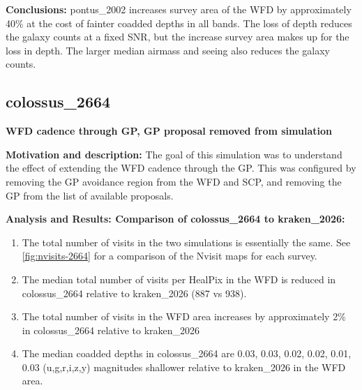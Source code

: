\documentclass[DM,authoryear,toc]{lsstdoc}
\begin{document}
\textbf{Conclusions:} pontus\_2002 increases survey area of the WFD by approximately 40$\%$ at the cost of fainter coadded depths in
all bands. The loss of depth reduces the galaxy counts at a fixed SNR, but the increase survey area makes up for the loss in depth. The
larger median airmass and seeing also reduces the galaxy counts.

\subsection{colossus\_2664} \label{colossus2664}

\textbf{WFD cadence through GP, GP proposal removed from simulation}

\textbf{Motivation and description:} The goal of this simulation was to understand the effect of extending the
WFD cadence through the GP. This was configured by removing the GP avoidance region from the WFD
and SCP, and removing the GP from the list of available proposals.

\textbf{Analysis and Results: Comparison of colossus\_2664 to kraken\_2026:}

\begin{enumerate}
\item The total number of visits in the two simulations is essentially the same. See \autoref{fig:nvisits-2664}
for a comparison of the Nvisit maps for each survey.
\item The median total number of visits per HealPix in the WFD is reduced in colossus\_2664  relative to kraken\_2026 (887 vs 938).
\item The total number of visits in the WFD area increases by approximately 2$\%$ in colossus\_2664 relative to kraken\_2026
\item The median coadded depths in colossus\_2664 are 0.03, 0.03, 0.02, 0.02, 0.01, 0.03 (u,g,r,i,z,y) magnitudes shallower relative
to kraken\_2026 in the WFD area.
\end{enumerate}
\end{document}
